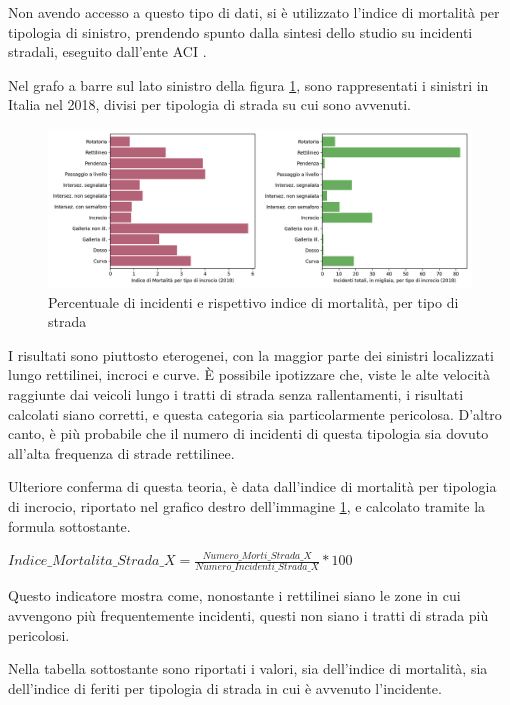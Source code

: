 \documentclass[a4paper]{report}
\begin{document}
Non avendo accesso a questo tipo di dati, si è utilizzato l'indice di 
mortalità per tipologia di sinistro, prendendo spunto dalla sintesi dello 
studio su incidenti stradali, eseguito dall'ente ACI \cite{ACI:2}. 

Nel grafo a barre sul lato sinistro della figura \ref{fig:tipo-intersezioni}, 
sono rappresentati i sinistri in Italia nel 2018, divisi per tipologia 
di strada su cui sono avvenuti. 

\begin{figure}
    \includegraphics[width=\linewidth]{img_unite/intersezioni_indice_mortalita.png}
    \caption{Percentuale di incidenti e rispettivo indice di mortalità, per tipo di strada}
    \label{fig:tipo-intersezioni}
\end{figure}

I risultati sono piuttosto eterogenei, con la maggior parte dei sinistri 
localizzati lungo rettilinei, incroci e curve. 
\`E possibile ipotizzare che, viste le alte velocità raggiunte dai veicoli 
lungo i tratti di strada senza rallentamenti, i risultati calcolati siano corretti, 
e questa categoria sia particolarmente pericolosa. 
D'altro canto, è più probabile che il numero di incidenti di questa tipologia sia dovuto 
all'alta frequenza di strade rettilinee. 

Ulteriore conferma di questa teoria, è data dall'indice di mortalità per tipologia di incrocio, 
riportato nel grafico destro dell'immagine \ref{fig:tipo-intersezioni}, e calcolato tramite la 
formula sottostante. 

\begin{center}
    $Indice\_Mortalita\_Strada\_X = \displaystyle \frac{Numero\_Morti\_Strada\_X}{Numero\_Incidenti\_Strada\_X} * 100$ 
\end{center}

Questo indicatore mostra come, nonostante i rettilinei siano le zone in cui 
avvengono più frequentemente incidenti, questi non siano i tratti di 
strada più pericolosi. 

Nella tabella sottostante sono riportati i valori, sia dell'indice di mortalità, 
sia dell'indice di feriti per tipologia di strada in cui è avvenuto l'incidente. 
\end{document}
